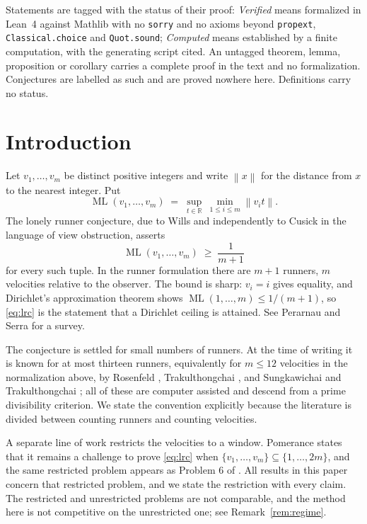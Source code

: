 \documentclass[11pt]{amsart}
\theoremstyle{plain}
\theoremstyle{definition}
\newcommand{\Norm}[1]{\left\lVert #1 \right\rVert}
\newcommand{\ML}{\operatorname{ML}}
\begin{document}
Statements are tagged with the status of their proof: \emph{Verified} means formalized in Lean~4
against Mathlib with no \texttt{sorry} and no axioms beyond \texttt{propext},
\texttt{Classical.choice} and \texttt{Quot.sound}; \emph{Computed} means established by a finite
computation, with the generating script cited. An untagged theorem, lemma, proposition or corollary
carries a complete proof in the text and no formalization. Conjectures are labelled as such and are
proved nowhere here. Definitions carry no status.


\maketitle

\section{Introduction}

Let $v_1,\dots,v_m$ be distinct positive integers and write $\Norm{x}$ for the distance from $x$ to
the nearest integer. Put
\[
  \ML(v_1,\dots,v_m) \;=\; \sup_{t \in \mathbb{R}} \ \min_{1 \le i \le m} \Norm{v_i t}.
\]
The lonely runner conjecture, due to Wills and independently to Cusick in the language of view
obstruction, asserts
\begin{equation}\label{eq:lrc}
  \ML(v_1,\dots,v_m) \;\ge\; \frac{1}{m+1}
\end{equation}
for every such tuple. In the runner formulation there are $m+1$ runners, $m$ velocities relative to
the observer. The bound is sharp: $v_i = i$ gives equality, and Dirichlet's approximation theorem
shows $\ML(1,\dots,m) \le 1/(m+1)$, so \eqref{eq:lrc} is the statement that a Dirichlet ceiling is
attained. See Perarnau and Serra \cite{PS} for a survey.

The conjecture is settled for small numbers of runners. At the time of writing it is known for at
most thirteen runners, equivalently for $m \le 12$ velocities in the normalization above, by
Rosenfeld \cite{Ros8,Ros9}, Trakulthongchai \cite{Tra}, and Sungkawichai and Trakulthongchai
\cite{ST}; all of these are computer assisted and descend from a prime divisibility criterion. We
state the convention explicitly because the literature is divided between counting runners and
counting velocities.

A separate line of work restricts the velocities to a window. Pomerance \cite{Pom} states that it
remains a challenge to prove \eqref{eq:lrc} when $\{v_1,\dots,v_m\} \subseteq \{1,\dots,2m\}$, and
the same restricted problem appears as Problem 6 of \cite{PS}. All results in this paper concern
that restricted problem, and we state the restriction with every claim. The restricted and
unrestricted problems are not comparable, and the method here is not competitive on the
unrestricted one; see Remark~\ref{rem:regime}.
\end{document}
